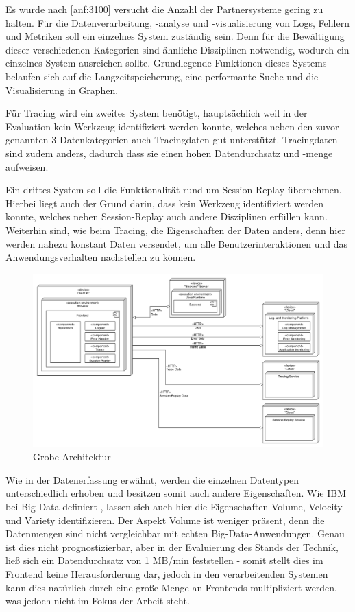 	Es wurde nach \autoref{anf:3100} versucht die Anzahl der Partnersysteme gering zu halten. Für die Datenverarbeitung, -analyse und -visualisierung von Logs, Fehlern und Metriken soll ein einzelnes System zuständig sein. Denn für die Bewältigung dieser verschiedenen Kategorien sind ähnliche Disziplinen notwendig, wodurch ein einzelnes System ausreichen sollte. Grundlegende Funktionen dieses Systems belaufen sich auf die Langzeitspeicherung, eine performante Suche und die Visualisierung in Graphen.
	
	Für Tracing wird ein zweites System benötigt, hauptsächlich weil in der Evaluation kein Werkzeug identifiziert werden konnte, welches neben den zuvor genannten 3 Datenkategorien auch Tracingdaten gut unterstützt. Tracingdaten sind zudem anders, dadurch dass sie einen hohen Datendurchsatz und -menge aufweisen.
	
	Ein drittes System soll die Funktionalität rund um Session-Replay übernehmen. Hierbei liegt auch der Grund darin, dass kein Werkzeug identifiziert werden konnte, welches neben Session-Replay auch andere Disziplinen erfüllen kann. Weiterhin sind, wie beim Tracing, die Eigenschaften der Daten anders, denn hier werden nahezu konstant Daten versendet, um alle Benutzerinteraktionen und das Anwendungsverhalten nachstellen zu können.
	
\begin{figure}[H]
	\centering
	\includegraphics[width=0.65\linewidth]{img/04_erstellung-poc/konzept-simple.png}
	\caption{Grobe Architektur}
	\label{fig:grobe-architektur}
\end{figure}

Wie in der Datenerfassung erwähnt, werden die einzelnen Datentypen unterschiedlich erhoben und besitzen somit auch andere Eigenschaften. Wie IBM bei Big Data definiert \cite{ZikopoulosUnderstandingBigData}, lassen sich auch hier die Eigenschaften Volume, Velocity und Variety identifizieren. Der Aspekt Volume ist weniger präsent, denn die Datenmengen sind nicht vergleichbar mit echten Big-Data-Anwendungen. Genau ist dies nicht prognostizierbar, aber in der Evaluierung des Stands der Technik, ließ sich ein Datendurchsatz von 1 MB/min feststellen - somit stellt dies im Frontend keine Herausforderung dar, jedoch in den verarbeitenden Systemen kann dies natürlich durch eine große Menge an Frontends multipliziert werden, was jedoch nicht im Fokus der Arbeit steht.


